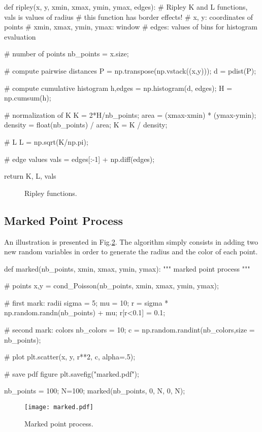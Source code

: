 \begin{python}
def ripley(x, y, xmin, xmax, ymin, ymax, edges):
    # Ripley K and L functions, vals is values of radius
    # this function has border effects!
    # x, y: coordinates of points
    # xmin, xmax, ymin, ymax: window
    # edges: values of bins for histogram evaluation
    
    # number of points    
    nb_points = x.size;
    
    # compute pairwise distances
    P = np.transpose(np.vstack((x,y)));
    d =  pdist(P);
    
    # compute cumulative histogram
    h,edges = np.histogram(d, edges);
    H = np.cumsum(h);
    
    # normalization of K    
    K = 2*H/nb_points;
    area = (xmax-xmin) * (ymax-ymin);
    density = float(nb_points) / area;
    K = K / density;
    
    # L
    L = np.sqrt(K/np.pi);
    
    # edge values
    vals = edges[:-1] + np.diff(edges);
    
    return K, L, vals
\end{python}

\begin{figure}[H]
 \centering\caption{Ripley functions.}%
 \hfill
 \label{fig:point_process_generation:python:ripley}%
\end{figure} 

\subsection{Marked Point Process}
An illustration is presented in Fig.\ref{fig:point_process_generation:python:marked}. The algorithm simply consists in adding two new random variables in order to generate the radius and the color of each point.

\begin{python}
def marked(nb_points, xmin, xmax, ymin, ymax):
    """
    marked point process
    """
    
    # points
    x,y = cond_Poisson(nb_points, xmin, xmax, ymin, ymax);
    
    # first mark: radii
    sigma = 5;
    mu = 10;
    r = sigma * np.random.randn(nb_points) + mu;
    r[r<0.1] = 0.1;
    
    # second mark: colors
    nb_colors = 10;
    c = np.random.randint(nb_colors,size = nb_points);
    
    # plot
    plt.scatter(x, y, r**2, c, alpha=.5);
	 
	 # save pdf figure
	 plt.savefig("marked.pdf");
    
nb_points = 100;
N=100;
marked(nb_points, 0, N, 0, N);
\end{python}

\begin{figure}[H]
 \centering\caption{Marked point process.}%
 \texttt{[image: marked.pdf]}%
 \label{fig:point_process_generation:python:marked}%
\end{figure}
